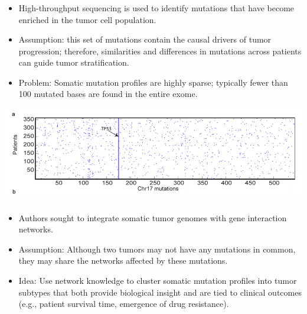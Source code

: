 \begin{frame}[fragile] \frametitle{}
    \begin{itemize}
        \item High-throughput sequencing is used to identify mutations that
            have become enriched in the tumor cell population.
        \item Assumption: this set of mutations contain the causal drivers
            of tumor progression; therefore, similarities and differences in
            mutations across patients can guide tumor stratification.
        \item Problem: Somatic mutation profiles are highly sparse; typically
            fewer than 100 mutated bases are found in the entire exome.
    \end{itemize}
    \includegraphics[scale=0.3]{img/suppfig1.png}
\end{frame}
\begin{frame}[fragile] \frametitle{}
    \begin{itemize}
        \item Authors sought to integrate somatic tumor genomes with gene
            interaction networks.
        \item Assumption: Although two tumors may not have any mutations in
            common, they may share the networks affected by these mutations.
        \item Idea: Use network knowledge to cluster somatic mutation profiles
            into tumor subtypes that both provide biological insight and are
            tied to clinical outcomes (e.g., patient survival time, emergence
            of drug resistance).
    \end{itemize}
\end{frame}
